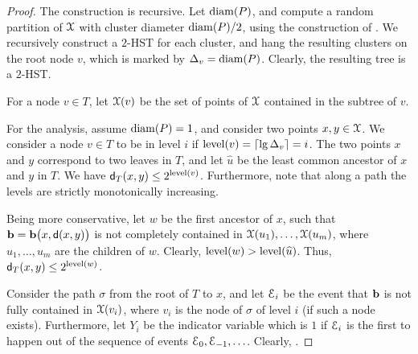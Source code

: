 \begin{proof}
    The construction is recursive. Let $\mathrm{diam}(P)$, and
    compute a random partition of $\FMS$ with cluster diameter
    $\mathrm{diam}(P)/2$, using the construction of . We
    recursively construct a $2$-HST for each cluster, and hang the
    resulting clusters on the root node $v$, which is marked by
    $\Delta_v = \mathrm{diam}(P)$. Clearly, the resulting tree is a $2$-HST.
    
    For a node $v \in T$, let $\FMS(v)$ be the set of points of $\FMS$
    contained in the subtree of $v$.

    For the analysis, assume $\mathrm{diam}(P)=1$, and consider two points
    $x,y \in \FMS$. We consider a node $v \in T$ to be in level $i$ if
    $\mathop{\mathrm{level}}(v) = \left\lceil {\lg \Delta_v } \right\rceil =i$. The two points $x$ and $y$
    correspond to two leaves in $T$, and let $\widehat{u}$ be the least common
    ancestor of $x$ and $y$ in $T$. We have $\mathsf{d}_T(x,y) \leq
    2^{\mathop{\mathrm{level}}(v)}$. Furthermore, note that along a path the levels are
    strictly monotonically increasing.
    
    Being more conservative, let $w$ be the first ancestor of $x$,
    such that $\mathbf{b} = \mathbf{b} \bigl( x,\mathsf{d}(x,y) \bigr)$ is not
    completely contained in $\FMS({u_1}), \ldots, \FMS({u_m})$, where
    $u_1, \ldots, u_m$ are the children of $w$. Clearly,
    $\level(w) > \level\pth{\widehat{ u}}$. Thus,
    $\mathsf{d}_T(x,y) \leq 2^{\mathop{\mathrm{level}}(w)}$.
    
    Consider the path $\sigma$ from the root of $T$ to $x$, and let
    $\EuScript{E}_i$ be the event that $\mathbf{b}$ is not fully contained in
    $\FMS(v_i)$, where $v_i$ is the node of $\sigma$ of level $i$ (if
    such a node exists). Furthermore, let $Y_i$ be the indicator
    variable which is $1$ if $\EuScript{E}_i$ is the first to happen out
    of the sequence of events $\EuScript{E}_0, \EuScript{E}_{-1}, \ldots$.
    Clearly, .
    

\end{proof}
